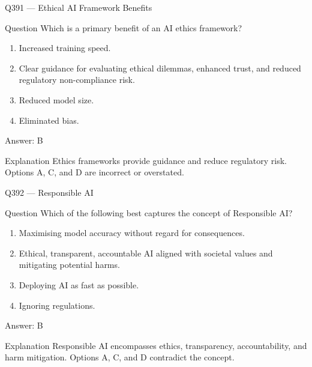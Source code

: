 \documentclass[aspectratio=169,8pt]{beamer}
\begin{document}
	\begin{frame}{Q391 --- Ethical AI Framework Benefits}
		\begin{block}{Question}
			Which is a primary benefit of an AI ethics framework?
			\begin{enumerate}
				\item Increased training speed.
				\item Clear guidance for evaluating ethical dilemmas, enhanced trust, and reduced regulatory non-compliance risk.
				\item Reduced model size.
				\item Eliminated bias.
			\end{enumerate}
		\end{block}
		\begin{exampleblock}{Answer: B}\end{exampleblock}
		\begin{block}{Explanation}
			Ethics frameworks provide guidance and reduce regulatory risk. Options A, C, and D are incorrect or overstated.
		\end{block}
	\end{frame}
	
	\begin{frame}{Q392 --- Responsible AI}
		\begin{block}{Question}
			Which of the following best captures the concept of Responsible AI?
			\begin{enumerate}
				\item Maximising model accuracy without regard for consequences.
				\item Ethical, transparent, accountable AI aligned with societal values and mitigating potential harms.
				\item Deploying AI as fast as possible.
				\item Ignoring regulations.
			\end{enumerate}
		\end{block}
		\begin{exampleblock}{Answer: B}\end{exampleblock}
		\begin{block}{Explanation}
			Responsible AI encompasses ethics, transparency, accountability, and harm mitigation. Options A, C, and D contradict the concept.
		\end{block}
	\end{frame}
	
\end{document}
